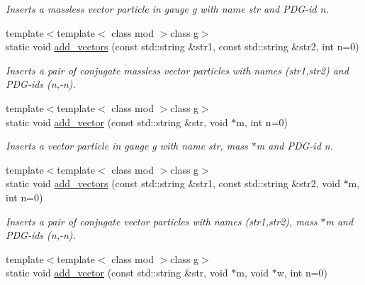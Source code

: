 \begin{DoxyCompactItemize}
\begin{DoxyCompactList}\small\item\em Inserts a massless vector particle in gauge g with name str and P\+D\+G-\/id n. \end{DoxyCompactList}\item 
\hypertarget{a00372_ad582726dbded0bc66c8f8bda99446b7d}{}{\footnotesize template$<$template$<$ class mod $>$class g$>$ }\\static void \hyperlink{a00372_ad582726dbded0bc66c8f8bda99446b7d}{add\+\_\+vectors} (const std\+::string \&str1, const std\+::string \&str2, int n=0)\label{a00372_ad582726dbded0bc66c8f8bda99446b7d}

\begin{DoxyCompactList}\small\item\em Inserts a pair of conjugate massless vector particles with names (str1,str2) and P\+D\+G-\/ids (n,-\/n). \end{DoxyCompactList}\item 
\hypertarget{a00372_ab03c093b9bd2cf4d67f646204bf2f7d0}{}{\footnotesize template$<$template$<$ class mod $>$class g$>$ }\\static void \hyperlink{a00372_ab03c093b9bd2cf4d67f646204bf2f7d0}{add\+\_\+vector} (const std\+::string \&str, void $\ast$m, int n=0)\label{a00372_ab03c093b9bd2cf4d67f646204bf2f7d0}

\begin{DoxyCompactList}\small\item\em Inserts a vector particle in gauge g with name str, mass $\ast$m and P\+D\+G-\/id n. \end{DoxyCompactList}\item 
\hypertarget{a00372_ab97bc2dcf6fa9351a4d615be5e7a8425}{}{\footnotesize template$<$template$<$ class mod $>$class g$>$ }\\static void \hyperlink{a00372_ab97bc2dcf6fa9351a4d615be5e7a8425}{add\+\_\+vectors} (const std\+::string \&str1, const std\+::string \&str2, void $\ast$m, int n=0)\label{a00372_ab97bc2dcf6fa9351a4d615be5e7a8425}

\begin{DoxyCompactList}\small\item\em Inserts a pair of conjugate vector particles with names (str1,str2), mass $\ast$m and P\+D\+G-\/ids (n,-\/n). \end{DoxyCompactList}\item 
\hypertarget{a00372_a8fb7f8b4ddb45dc1889b046a0f333a3b}{}{\footnotesize template$<$template$<$ class mod $>$class g$>$ }\\static void \hyperlink{a00372_a8fb7f8b4ddb45dc1889b046a0f333a3b}{add\+\_\+vector} (const std\+::string \&str, void $\ast$m, void $\ast$w, int n=0)\label{a00372_a8fb7f8b4ddb45dc1889b046a0f333a3b}


\end{DoxyCompactItemize}
